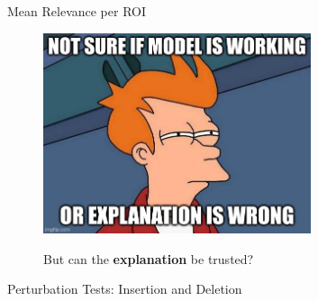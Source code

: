 \documentclass[aspectratio=169,xcolor={table, dvipsnames}]{beamer}
\renewcommand{\emph}[1]{\textbf{#1}}
\begin{document}
\begin{frame}{Mean Relevance per ROI}
	
\end{frame}
\begin{frame}[plain]
	\begin{center}
		\begin{figure}
			\href{https://knowyourmeme.com/memes/futurama-fry-not-sure-if}{
				\includegraphics[width=0.7\textwidth]{figures/fry-and-xai-2.png
				}}
			\caption*{But can the \emph{explanation} be trusted?}
		\end{figure}

	\end{center}
\end{frame}


\begin{frame}[plain]{Perturbation Tests: Insertion and Deletion \cite{petsiuk_rise_2018}}
	\begin{figure}
		
	\end{figure}
\end{frame}
\end{document}
